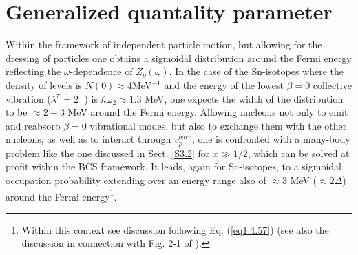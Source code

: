  \section{Generalized quantality parameter}\label{App1D}
 Within the framework of independent particle motion, but allowing for the dressing of particles one obtains a sigmoidal distribution around the Fermi energy reflecting the $\omega$-dependence of $Z_\nu(\omega)$. In the case of the Sn-isotopes where the density of levels is $N(0)\approx 4$MeV$^{-1}$ and the energy of the lowest $\beta=0$ collective vibration ($\lambda^\pi=2^+$) is $\hbar\omega_2\approx1.3$ MeV, one expects the width of the distribution to be $\approx2-3$ MeV around the Fermi energy. Allowing nucleons not only to emit and reabsorb $\beta=0$ vibrational modes, but also to exchange them with the other nucleons, as well as to interact through $v_{p}^{bare}$, one is confronted with a many-body problem like the one discussed in Sect. \ref{S3.2}  for $x\gg1/2$,  which can be solved at profit within the BCS framework. It leads, again for Sn-isotopes, to a sigmoidal occupation probability extending over an energy range also of $\approx 3$ MeV ($\approx 2\Delta$) around the Fermi energy\footnote{Within this context see discussion following Eq. (\ref{eq1.4.57}) (see also the discussion in connection with Fig. 2-1 of \cite{Tinkham:96}).}. 
 
